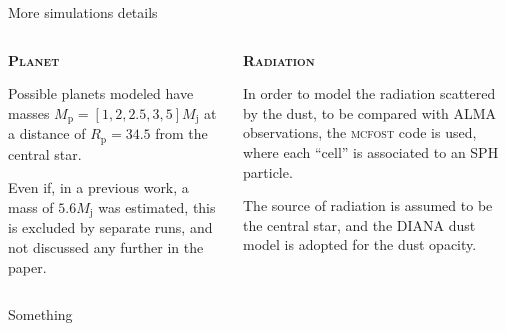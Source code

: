 \documentclass[9pt]{beamer}
\begin{document}
\begin{frame}{More simulations details}
    \begin{columns}
        \begin{column}{0.5\textwidth}
            \indent\textsc{\textbf{\Large Planet}}
            \vspace*{5pt}
                
            Possible planets modeled have masses $M_\text{p} = [1, 2, 2.5, 3,
            5] M_\text{j}$ at a distance of $R_\text{p} = 34.5$ from the
            central star.

            Even if, in a previous work, a mass of $5.6 M_\text{j}$ was
            estimated, this is excluded by separate runs, and not discussed any
            further in the paper.
        \end{column}
        \begin{column}{0.5\textwidth}
            \indent\textsc{\textbf{\Large Radiation}}
            \vspace*{5pt}

            In order to model the radiation scattered by the dust, to be
            compared with ALMA observations, the \textsc{mcfost} code is used,
            where each \enquote{cell} is associated to an SPH particle.

            The source of radiation is assumed to be the central star, and the
            DIANA dust model is adopted for the dust opacity.
        \end{column}
    \end{columns}
\end{frame}

\begin{frame}{Something}
    \begin{columns}
        \begin{column}{0.5\textwidth}
        \end{column}
        \begin{column}{0.5\textwidth}
        \end{column}
    \end{columns}
\end{frame}
\end{document}
